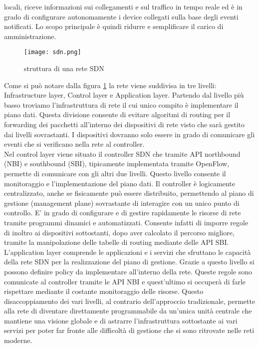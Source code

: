 locali, riceve informazioni sui collegamenti e sul traffico in tempo reale ed è in grado di
configurare autonomamente i device collegati sulla base degli eventi notificati. Lo scopo
principale è quindi ridurre e semplificare il carico di amministrazione.
\begin{figure}[h]
    \centering
   \texttt{[image: sdn.png]}
    \caption{struttura di una rete SDN}
    \label{fig:sdn}
\end{figure}
Come si può notare dalla figura \ref{fig:sdn} la rete viene suddivisa in tre livelli: Infrastructure layer, Control layer e Application layer.
Partendo dal livello più basso troviamo l'infrastruttura di rete il cui unico compito è implementare il piano dati. 
Questa divisione consente di evitare algoritmi
di routing per il forwarding dei pacchetti all'interno dei dispositivi di rete visto che sarà
gestito dai livelli sovrastanti. I dispositivi dovranno solo essere in grado di comunicare gli
eventi che si verificano nella rete al controller.
\\Nel control layer viene situato il controller SDN che tramite API northbound (NBI) e southbound (SBI), tipicamente implementata tramite OpenFlow, permette di comunicare con
gli altri due livelli. Questo livello consente il monitoraggio e l'implementazione del piano
dati. Il controller è logicamente centralizzato, anche se fisicamente può essere distribuito, permettendo al piano di gestione (management plane) sovrastante di interagire con un
unico punto di controllo. E' in grado di configurare e di gestire rapidamente le risorse di rete tramite programmi dinamici e automatizzati. Consente infatti di imporre regole di
inoltro ai dispositivi sottostanti, dopo aver calcolato il percorso migliore, tramite la manipolazione delle tabelle di routing mediante delle API SBI.
\\L'application layer comprende le applicazioni e i servizi che sfruttano le capacità della
rete SDN per la realizzazione del piano di gestione. Grazie a questo livello si possono
definire policy da implementare all'interno della rete. Queste regole sono comunicate al
controller tramite le API NBI e quest'ultimo si occuperà di farle rispettare mediante il costante monitoraggio delle risorse. 
Questo disaccoppiamento dei vari livelli, al contrario dell'approccio
tradizionale, permette alla rete di diventare direttamente programmabile da un'unica unità
centrale che mantiene una visione globale e di astrarre l'infrastruttura sottostante ai vari servizi per poter far fronte alle difficoltà di gestione che si sono ritrovate nelle reti
moderne.
